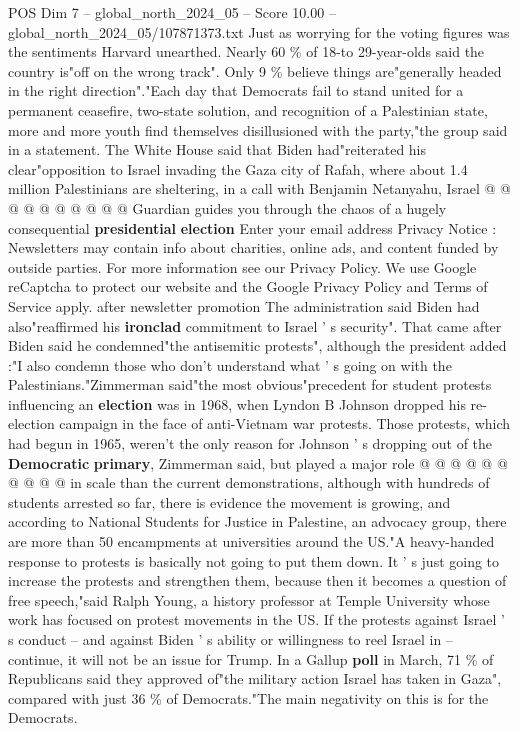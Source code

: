 \begin{textsample}{POS Dim 7 – global\_north\_2024\_05 – Score 10.00 – global\_north\_2024\_05/107871373.txt}
Just as worrying for the voting figures was the sentiments Harvard unearthed.
Nearly 60 \% of 18-to 29-year-olds said the country is"off on the wrong track".
Only 9 \% believe things are"generally headed in the right direction"."Each day that Democrats fail to stand united for a permanent ceasefire, two-state solution, and recognition of a Palestinian state, more and more youth find themselves disillusioned with the party,"the group said in a statement.
The White House said that Biden had"reiterated his clear"opposition to Israel invading the Gaza city of Rafah, where about 1.4 million Palestinians are sheltering, in a call with Benjamin Netanyahu, Israel @ @ @ @ @ @ @ @ @ @ Guardian guides you through the chaos of a hugely consequential \textbf{presidential} \textbf{election} Enter your email address Privacy Notice : Newsletters may contain info about charities, online ads, and content funded by outside parties.
For more information see our Privacy Policy.
We use Google reCaptcha to protect our website and the Google Privacy Policy and Terms of Service apply. after newsletter promotion The administration said Biden had also"reaffirmed his \textbf{ironclad} commitment to Israel ' s security".
That came after Biden said he condemned"the antisemitic protests", although the president added :"I also condemn those who don't understand what ' s going on with the Palestinians."Zimmerman said"the most obvious"precedent for student protests influencing an \textbf{election} was in 1968, when Lyndon B Johnson dropped his re-election campaign in the face of anti-Vietnam war protests.
Those protests, which had begun in 1965, weren't the only reason for Johnson ' s dropping out of the \textbf{Democratic} \textbf{primary}, Zimmerman said, but played a major role @ @ @ @ @ @ @ @ @ @ in scale than the current demonstrations, although with hundreds of students arrested so far, there is evidence the movement is growing, and according to National Students for Justice in Palestine, an advocacy group, there are more than 50 encampments at universities around the US."A heavy-handed response to protests is basically not going to put them down.
It ' s just going to increase the protests and strengthen them, because then it becomes a question of free speech,"said Ralph Young, a history professor at Temple University whose work has focused on protest movements in the US.
If the protests against Israel ' s conduct -- and against Biden ' s ability or willingness to reel Israel in -- continue, it will not be an issue for Trump.
In a Gallup \textbf{poll} in March, 71 \% of Republicans said they approved of"the military action Israel has taken in Gaza", compared with just 36 \% of Democrats."The main negativity on this is for the Democrats.

\end{textsample}
